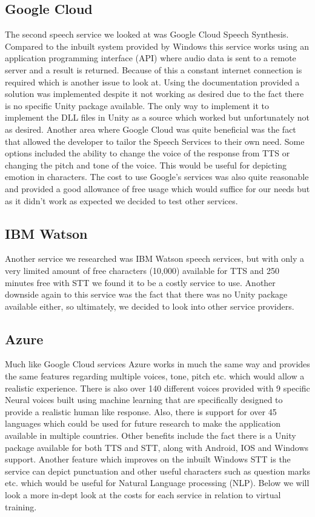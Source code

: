 \subsection{Google Cloud}
The second speech service we looked at was Google Cloud Speech Synthesis. Compared to the inbuilt system provided by Windows this service works using an application programming interface (API) where audio data is sent to a remote server and a result is returned. Because of this a constant internet connection is required which is another issue to look at. Using the documentation provided a solution was implemented despite it not working as desired due to the fact there is no specific Unity package available. The only way to implement it to implement the DLL files in Unity as a source which worked but unfortunately not as desired. Another area where Google Cloud was quite beneficial was the fact that allowed the developer to tailor the Speech Services to their own need. Some options included the ability to change the voice of the response from TTS or changing the pitch and tone of the voice. This would be useful for depicting emotion in characters. The cost to use Google's services was also quite reasonable and provided a good allowance of free usage which would suffice for our needs but as it didn't work as expected we decided to test other services. 

\subsection{IBM Watson}
Another service we researched was IBM Watson speech services, but with only a very limited amount of free characters (10,000) available for TTS and 250 minutes free with STT we found it to be a costly service to use. Another downside again to this service was the fact that there was no Unity package available either, so ultimately, we decided to look into other service providers.

\subsection{Azure}
Much like Google Cloud services Azure works in much the same way and provides the same features regarding multiple voices, tone, pitch etc. which would allow a realistic experience. There is also over 140 different voices provided with 9 specific Neural voices built using machine learning that are specifically designed to provide a realistic human like response. Also, there is support for over 45 languages which could be used for future research to make the application available in multiple countries. Other benefits include the fact there is a Unity package available for both TTS and STT, along with Android, IOS and Windows support. Another feature which improves on the inbuilt Windows STT is the service can depict punctuation and other useful characters such as question marks etc. which would be useful for Natural Language processing (NLP). Below we will look a more in-dept look at the costs for each service in relation to virtual training.


